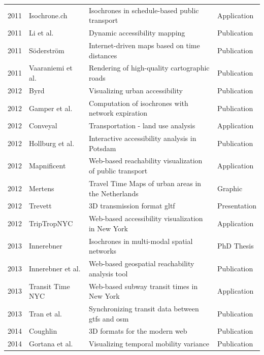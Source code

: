 \begin{table}[htp]
\begin{tabular}{r|l|l|l}
      2011 & Isochrone.ch \cite{IsochroneCh}  & Isochrones in schedule-based public transport  & Application  \\
      2011 & Li et al. \cite{li2011dynamic} & Dynamic accessibility mapping  & Publication  \\
      2011 & Söderström \cite{soderstrom2011personal} & Internet-driven maps based on time distances  & Publication  \\
      2011 & Vaaraniemi et al. \cite{Vaaraniemi2011} & Rendering of high-quality cartographic roads & Publication \\
      2012 & Byrd \cite{Byrd2012} & Visualizing urban accessibility  & Publication  \\
      2012 & Gamper et al. \cite{gamper2012scalable} & Computation of isochrones with network expiration  & Publication  \\
      2012 & Conveyal \cite{Conveyal} & Transportation - land use analysis  & Application  \\
      2012 & Hollburg et al. \cite{hollburghier} & Interactive accessibility analysis in Potsdam & Publication  \\
      2012 & Mapnificent \cite{Mapnificent}  & Web-based reachability visualization of public transport  & Application  \\
      2012 & Mertens \cite{meertens2012} & Travel Time Maps of urban areas in the Netherlands  & Graphic  \\
      2012 & Trevett \cite{Trevett2012} & 3D transmission format \acrshort{gltf} & Presentation \\
      2012 & TripTropNYC \cite{TriptropNYC} & Web-based accessibility visualization in New York  & Application  \\
      2013 & Innerebner \cite{Innerebner2013} & Isochrones in multi-modal spatial networks  & PhD Thesis  \\
      2013 & Innerebner et al. \cite{innerebner2013isoga} & Web-based geospatial reachability analysis tool  & Publication  \\
      2013 & Transit Time NYC \cite{TransitTimeNYC} & Web-based subway transit times in New York & Application \\
      2013 & Tran et al. \cite{tran2013go_sync} & Synchronizing transit data between \acrshort{gtfs} and \acrshort{osm}  & Publication  \\
      2014 & Coughlin \cite{Coughlin2014} & 3D formats for the modern web & Publication \\
      2014 & Gortana et al. \cite{gortanaisoscope} & Visualizing temporal mobility variance  & Publication  \\

\end{tabular}
\end{table}
